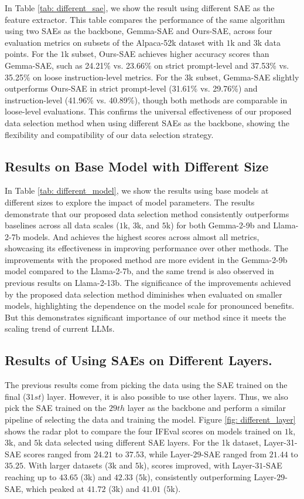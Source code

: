 In Table \ref{tab: different_sae}, we show the result using different SAE as the feature extractor.
This table compares the performance of the same algorithm \one using two SAEs as the backbone, Gemma-SAE and Ours-SAE, across four evaluation metrics on subsets of the Alpaca-52k dataset with $1$k and $3$k data points. 
For the $1$k subset, Ours-SAE achieves higher accuracy scores than Gemma-SAE, such as 24.21\% vs. 23.66\% on strict prompt-level and 37.53\% vs. 35.25\% on loose instruction-level metrics. For the $3$k subset, Gemma-SAE slightly outperforms Ours-SAE in strict prompt-level (31.61\% vs. 29.76\%) and instruction-level (41.96\% vs. 40.89\%), though both methods are comparable in loose-level evaluations.
This confirms the universal effectiveness of our proposed data selection method when using different SAEs as the backbone, showing the flexibility and compatibility of our data selection strategy.

\subsection{Results on Base Model with Different Size}

In Table \ref{tab: different_model}, we show the results using base models at different sizes to explore the impact of model parameters.
The results demonstrate that our proposed data selection method consistently outperforms baselines across all data scales ($1$k, $3$k, and $5$k) for both Gemma-2-9b and Llama-2-7b models.
And \two achieves the highest scores across almost all metrics, showcasing its effectiveness in improving performance over other methods.
The improvements with the proposed method are more evident in the Gemma-2-9b model compared to the Llama-2-7b, and the same trend is also observed in previous results on Llama-2-13b. 
The significance of the improvements achieved by the proposed data selection method diminishes when evaluated on smaller models, highlighting the dependence on the model scale for pronounced benefits. But this demonstrates significant importance of our method since it meets the scaling trend of current LLMs.

\subsection{Results of Using SAEs on Different Layers.}
The previous results come from picking the data using the SAE trained on the final ($31st$) layer. However, it is also possible to use other layers. Thus, we also pick the SAE trained on the $29th$ layer as the backbone and perform a similar pipeline of selecting the data and training the model.
Figure \ref{fig: different_layer} shows the radar plot to compare the four IFEval scores on models trained on $1$k, $3$k, and $5$k data selected using different SAE layers. 
For the 1k dataset, Layer-31-SAE scores ranged from $24.21$ to $37.53$, while Layer-$29$-SAE ranged from $21.44$ to $35.25$. With larger datasets ($3$k and $5$k), scores improved, with Layer-$31$-SAE reaching up to $43.65$ ($3$k) and $42.33$ ($5$k), consistently outperforming Layer-$29$-SAE, which peaked at $41.72$ ($3$k) and $41.01$ ($5$k).



